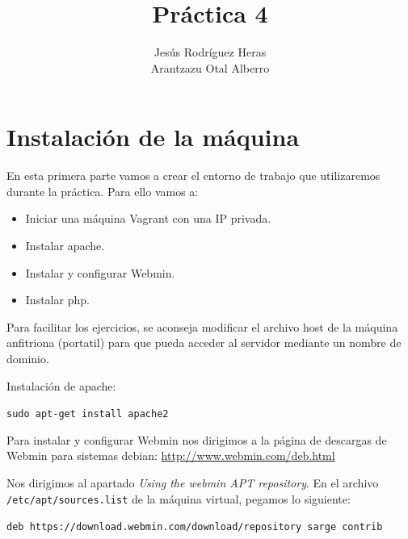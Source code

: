 \documentclass[12pt,letterpaper]{article}
\title{Práctica 4}
\author{Jesús Rodríguez Heras\\
	Arantzazu Otal Alberro}
\begin{document}
	
	\maketitle
%			
	\thispagestyle{empty}
	\newpage
	
	
	
	
	
	
\section{Instalación de la máquina}
En esta primera parte vamos a crear el entorno de trabajo que utilizaremos durante la práctica. Para ello vamos a:
\begin{itemize}
	\item Iniciar una máquina Vagrant con una IP privada.
	\item Instalar apache.
	\item Instalar y configurar Webmin.
	\item Instalar php.
\end{itemize}

Para facilitar los ejercicios, se aconseja modificar el archivo host de la máquina anfitriona (portatil) para que pueda acceder al servidor mediante un nombre de dominio.

Instalación de apache:
\begin{center}
	\texttt{sudo apt-get install apache2}
\end{center}

Para instalar y configurar Webmin nos dirigimos a la página de descargas de Webmin para sistemas debian: \url{http://www.webmin.com/deb.html}

Nos dirigimos al apartado \textit{Using the webmin APT repository}. En el archivo \texttt{/etc/apt/sources.list} de la máquina virtual, pegamos lo siguiente:
\begin{center}
	\texttt{deb https://download.webmin.com/download/repository sarge contrib}
\end{center}
\end{document}
